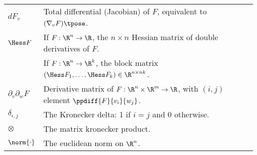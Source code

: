 \begin{table}[h!]
{\begin{tabular}{ll}
   \(dF_v\) & Total differential (Jacobian) of \(F\), equivalent to \((\nabla_v F)\tpose\). \\
   \(\Hess F\) & If \(F : \R^n \rightarrow \R\), the \(n \times n\) Hessian matrix of double derivatives of \(F\). \\
               & If \(F : \R^n \rightarrow \R^k\), the block matrix \((\Hess F_1, \ldots, \Hess F_k) \in \R^{n \times nk}\). \\
   \(\partial_v \partial_w F\) & Derivative matrix of \(F : \R^n \times \R^m \rightarrow \R\), with \((i,j)\) element \(\ppdiff{F}{v_i}{w_j}\). \\
   \(\delta_{i,j}\) & The Kronecker delta: 1 if \(i = j\) and 0 otherwise. \\
   \(\otimes\) & The matrix kronecker product. \\ 
   \(\norm{\cdot}\) & The euclidean norm on \(\R^n\). \\
   \bottomrule
\end{tabular}

}%
\end{table}

%
%
